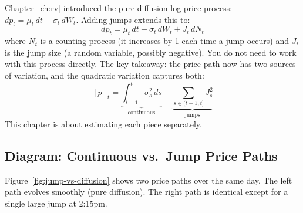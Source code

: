 \begin{prereq}
Chapter~\ref{ch:rv} introduced the pure-diffusion log-price process: $dp_t = \mu_t\,dt + \sigma_t\,dW_t$.
Adding jumps extends this to:
\[
  dp_t = \mu_t\,dt + \sigma_t\,dW_t + J_t\,dN_t
\]
where $N_t$ is a counting process (it increases by 1 each time a jump occurs) and $J_t$ is the jump size (a random variable, possibly negative).
You do not need to work with this process directly.
The key takeaway: the price path now has two sources of variation, and the quadratic variation captures both:
\[
  [p]_t = \underbrace{\int_{t-1}^{t}\sigma^2_s\,ds}_{\text{continuous}} + \underbrace{\sum_{s\in(t-1,t]} J^2_s}_{\text{jumps}}
\]
This chapter is about estimating each piece separately.
\end{prereq}

\subsection{Diagram: Continuous vs.\ Jump Price Paths}

Figure~\ref{fig:jump-vs-diffusion} shows two price paths over the same day.
The left path evolves smoothly (pure diffusion).
The right path is identical except for a single large jump at 2:15pm.

